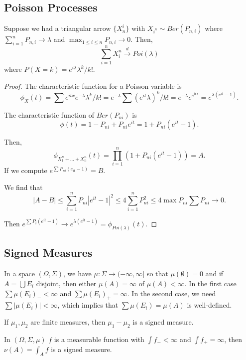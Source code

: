 \documentclass[11pt]{scrartcl}
\begin{document}
\subsection{Poisson Processes}
\begin{thm}
Suppose we had a triangular arrow $\{X_n^i\} $ with $X_{i^n} \sim Ber(P_{n, i})$ where $\sum_{i=1}^n P_{n, i} \to \lambda$ and $\max_{1 \le i \le n} P_{n, i} \to 0$.  Then,
 $$\sum_{i=1}^n X_i^n \xrightarrow{d} Poi(\lambda)$$
 where $P(X=  k) = e^{i\lambda} \lambda^k/k!$.
 \end{thm}
 \begin{proof}
The characteristic function for a Poisson variable is
$$\phi_X(t) = \sum e^{itx} e^{-\lambda} \lambda^{k}/k! = e^{-\lambda} \sum (e^{it} \lambda)^k/k! = e^{-\lambda} e^{e^{it \lambda}} = e^{\lambda(e^{it} - 1)}.$$

The characteristic function of $Ber(P_{ni})$ is $$\phi(t) = 1 - P_{ni} + P_{ni} e^{it} = 1 + P_{ni}(e^{it} - 1).$$

Then,
$$\phi_{X_1^n + \dots + X_n^n}(t) = \prod_{i=1}^n (1 + P_{ni}(e^{it} - 1)) = A.$$
If we compute $e^{\sum P_{ni}(e_{it} - 1)} = B$.

We find that $$|A - B| \le \sum_{i=1}^n P_{ni} |e^{it} - 1|^2 \le 4 \sum_{i=1}^n P_{ni}^2 \le 4 \max P_{ni} \sum  P_{ni} \to 0.$$

Then $e^{\sum P_i (e^{it} - 1)} \to e^{\lambda(e^{it} - 1)} = \phi_{Poi(\lambda)}(t).$
\end{proof} 
\subsection{Signed Measures}
\begin{definition} In a space $(\Omega, \Sigma)$, we have $\mu : \Sigma \to (-\infty, \infty]$ so that $\mu(\emptyset) = 0$ and 
if $A = \bigcup E_i$ disjoint, then either $\mu(A) = \infty$ of $\mu(A) < \infty$.  In the first case $\sum \mu(E_i)_{-} < \infty$ and $\sum \mu(E_i)_+ = \infty$.  In the second case, we need $\sum |\mu(E_i)| < \infty$, which implies that $\sum \mu(E_i) = \mu(A)$ is well-defined.
\end{definition}
\begin{example}  If $\mu_1, \mu_2$ are finite measures, then $\mu_1 - \mu_2$ is a signed measure.
\end{example}
\begin{example}
In $(\Omega, \Sigma, \mu)$ $f$ is a measurable function with $\int f_- < \infty$ and $\int f_+ = \infty$, then $\nu(A) = \int_A f$ is a signed measure.
\end{example}
\end{document}
